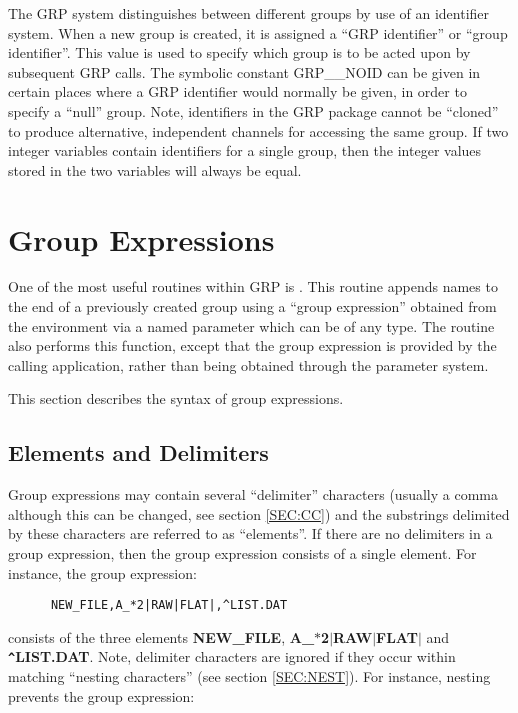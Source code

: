 The GRP system distinguishes between different groups by use of an {identifier}
system. When a new group is created, it is assigned a ``GRP identifier'' or
``group identifier''. This value is used to specify which group is to be acted
upon by subsequent GRP calls. The symbolic constant GRP\_\_NOID can be given in
certain places where a GRP identifier would normally be given, in order to
specify a ``null'' group. Note, identifiers in the GRP package cannot be
``cloned'' to produce alternative, independent channels for accessing the same
group. If two integer variables contain identifiers for a single group, then
the integer values stored in the two variables will always be equal.

\section {\label{SEC:GREXP}Group Expressions}
One of the most useful routines within GRP is . This routine appends
names to the end of a previously created group using a ``group expression''
obtained from the environment via a named parameter which can be of any type. The
routine  also performs this function, except that the group expression
is provided by the calling application, rather than being obtained through the
parameter system.

This section describes the syntax of group expressions.

\subsection{Elements and Delimiters}
Group expressions may contain several ``delimiter'' characters (usually a comma
although this can be changed, see section \ref{SEC:CC}) and the substrings
delimited by these characters are referred to as ``elements''. If there are no
delimiters in a group expression, then the group expression consists of a single
element. For instance, the group expression:

\small
\begin{verbatim}
      NEW_FILE,A_*2|RAW|FLAT|,^LIST.DAT
\end{verbatim}
\normalsize

consists of the three elements {\bf NEW\_FILE},
{\bf A\_$*$2$\mid$RAW$\mid$FLAT$\mid$} and {\bf
\verb+^+LIST.DAT}. Note, delimiter characters are ignored if they occur within
matching ``nesting characters'' (see section \ref{SEC:NEST}). For instance,
nesting prevents the group expression:

